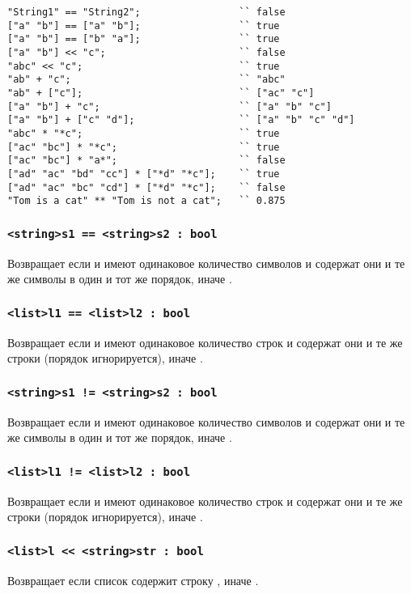 \documentclass[a4paper, 14pt]{extarticle}
\begin{document}
\begin{lstlisting}[caption=Примеры использования операторов над данными типа string и list, label=stringlistopex]
"String1" == "String2";					`` false
["a" "b"] == ["a" "b"];					`` true
["a" "b"] == ["b" "a"];					`` true
["a" "b"] << "c";						`` false
"abc" << "c";							`` true
"ab" + "c";								`` "abc"
"ab" + ["c"];							`` ["ac" "c"]
["a" "b"] + "c";						`` ["a" "b" "c"]
["a" "b"] + ["c" "d"];					`` ["a" "b" "c" "d"]
"abc" * "*c";							`` true
["ac" "bc"] * "*c";						`` true
["ac" "bc"] * "a*";						`` false
["ad" "ac" "bd" "cc"] * ["*d" "*c"];	`` true
["ad" "ac" "bc" "cd"] * ["*d" "*c"];	`` false
"Tom is a cat" ** "Tom is not a cat";	`` 0.875
\end{lstlisting}

\subsubsection{\lstinline`<string>s1 == <string>s2 : bool`}
	Возвращает  если  и  имеют одинаковое количество символов и содержат они и те же символы в один и тот же порядок, иначе .
	
\subsubsection{\lstinline`<list>l1 == <list>l2 : bool`}
	Возвращает  если  и  имеют одинаковое количество строк и содержат они и те же строки (порядок игнорируется), иначе .

\subsubsection{\lstinline`<string>s1 != <string>s2 : bool`}
	Возвращает  если  и  имеют одинаковое количество символов и содержат они и те же символы в один и тот же порядок, иначе .

\subsubsection{\lstinline`<list>l1 != <list>l2 : bool`}
	Возвращает  если  и  имеют одинаковое количество строк и содержат они и те же строки (порядок игнорируется), иначе .

\subsubsection{\lstinline`<list>l << <string>str : bool`}
	Возвращает  если список  содержит строку , иначе .
\end{document}
